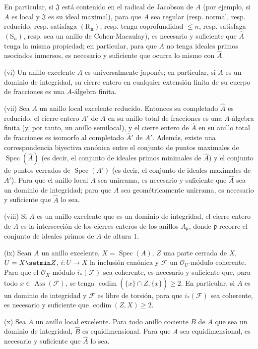 \begin{scholium}[7.8.3]
En particular, si $\mathfrak J$ está contenido en el radical de Jacobson de
$A$ \textup{(por ejemplo, si $A$ es local y $\mathfrak J$ es su ideal maximal)},
para que $A$ sea regular \textup{(resp.} normal, \textup{resp.} reducido, \textup{resp.} satisfaga
$(\mathrm R_{\boldsymbol n})$, \textup{resp.} tenga coprofundidad $\leq n$, \textup{resp.} satisfaga
$(\mathrm S_n)$, \textup{resp.} sea un anillo de Cohen-Macaulay), es necesario y
suficiente que $\widehat A$ tenga la misma propiedad; en particular, para
que $A$ no tenga ideales primos asociados inmersos, es necesario y suficiente
que ocurra lo mismo con $\widehat A$.

\textup{(vi)} Un anillo excelente $A$ es universalmente japonés; en particular, si
$A$ es un dominio de integridad, su cierre entero en cualquier extensión
finita de su cuerpo de fracciones es una $A$-álgebra finita.

\textup{(vii)} Sea $A$ un anillo \textup{local} excelente reducido. Entonces su completado
$\widehat A$ es reducido, el cierre entero $A'$ de $A$ en su anillo total
de fracciones es una $A$-álgebra finita \textup{(y, por tanto, un anillo} semilocal),
y el cierre entero de $\widehat A$ en su anillo total de fracciones es
isomorfo al completado $\widehat{A}'$ de $A'$. Además, existe una
correspondencia biyectiva canónica entre el conjunto de puntos maximales de
$\operatorname{Spec}(\widehat A)$ \textup{(es decir, el conjunto de ideales primos}
minimales \textup{de $\widehat A$)} y el conjunto de puntos cerrados de
$\operatorname{Spec}(A')$ \textup{(es decir, el conjunto de ideales} maximales \textup{de
$A'$)}. Para que el anillo local $A$ sea unirrama, es necesario y suficiente
que $\widehat A$ sea un dominio de integridad; para que $A$ sea
geométricamente unirrama, es necesario y suficiente que $\widehat A$ lo sea.

\textup{(viii)} Si $A$ es un anillo excelente que es un dominio de integridad, el
cierre entero de $A$ es la intersección de los cierres enteros de los anillos
$A_{\mathfrak p}$, donde $\mathfrak p$ recorre el conjunto de ideales
primos de $A$ de altura $1$.

\textup{(ix)} Sean $A$ un anillo excelente, $X=\operatorname{Spec}(A)$, $Z$ una parte
cerrada de $X$, $U=X\setmin Z$, $i:U\to X$ la inclusión canónica y $\mathcal F$
un $\mathcal O_U$-módulo coherente. Para que el $\mathcal O_X$-módulo
$i_*(\mathcal F)$ sea coherente, es necesario y suficiente que, para todo
$x\in\operatorname{Ass}(\mathcal F)$, se tenga
$\operatorname{codim}(\overline{\{x\}}\cap Z,\overline{\{x\}})\geq2$.
En particular, si $A$ es un dominio de integridad y $\mathcal F$ es libre
de torsión,
para que $i_*(\mathcal F)$ sea coherente, es necesario y suficiente que
$\operatorname{codim}(Z,X)\geq2$.


\textup{(x)} Sea $A$ un anillo local excelente. Para todo anillo cociente $B$ de $A$
que sea un dominio de integridad, $\widehat B$ es equidimensional. Para que
$A$ sea equidimensional, es necesario y suficiente que $\widehat A$ lo sea.
\end{scholium}

